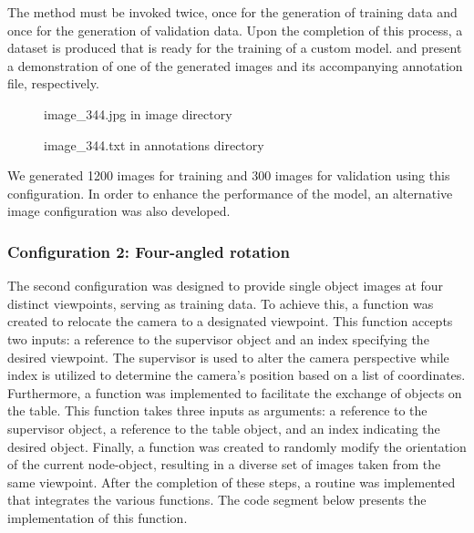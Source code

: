 The method must be invoked twice, once for the generation of training data and once for the generation of validation data. Upon the completion of this process, a dataset is produced that is ready for the training of a custom model.  and  present a demonstration of one of the generated images and its accompanying annotation file, respectively.

\begin{figure}[!h]
    \centering
    \caption{image\_344.jpg in image directory  }
    \label{fig:dataset_train_img}
\end{figure}

\begin{figure}[!h]
    \centering
    \caption{image\_344.txt in annotations directory  }
    \label{fig:dataset_train_ann}
\end{figure}

We generated 1200 images for training and 300 images for validation using this configuration. In order to enhance the performance of the model, an alternative image configuration was also developed.

\subsubsection{Configuration 2: Four-angled rotation}

The second configuration was designed to provide single object images at four distinct viewpoints, serving as training data. To achieve this, a function was created to relocate the camera to a designated viewpoint. This function accepts two inputs: a reference to the supervisor object and an index specifying the desired viewpoint. The supervisor is used to alter the camera perspective while index is utilized to determine the camera's position based on a list of coordinates. Furthermore, a function was implemented to facilitate the exchange of objects on the table. This function takes three inputs as arguments: a reference to the supervisor object, a reference to the table object, and an index indicating the desired object. Finally, a function was created to randomly modify the orientation of the current node-object, resulting in a diverse set of images taken from the same viewpoint. After the completion of these steps, a routine was implemented that integrates the various functions. The code segment below presents the implementation of this function. 

